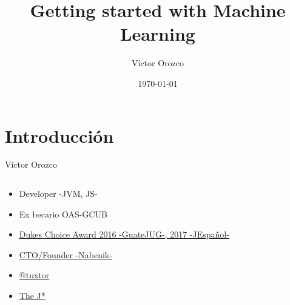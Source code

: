 \documentclass{beamer}
\title{Getting started with Machine Learning}
\author{Víctor Orozco}
\institute{Nabenik}
\date{\today}
\begin{document}
\frame{\titlepage}

\section{Introducción}


\begin{frame}{Víctor Orozco}
    \begin{columns}[T] %
        \begin{column}[T]{5cm} %
            \begin{itemize}
                \item Developer -JVM, JS- 
                \item Ex becario OAS-GCUB
                \item \href{https://www.oracle.com/javaone/dukes-choice-award.html}{Dukes Choice Award 2016 -GuateJUG-, 2017 -JEspañol-}
                \item \href{http://www.nabenik.com}{CTO/Founder -Nabenik-}
                \item \href{https://twitter.com/tuxtor}{@tuxtor}
                \item \href{http://vorozco.com}{The J*} 
            \end{itemize}
        \end{column}
        \begin{column}[T]{3cm} %
            \begin{figure}
                \centering

\end{figure}
\end{column}
\end{columns}
\end{frame}
\end{document}

